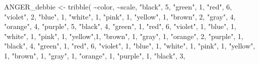 \documentclass[
]{article}
\newenvironment{Shaded}{\begin{snugshade}}{\end{snugshade}}
\newcommand{\DecValTok}[1]{\textcolor[rgb]{0.00,0.00,0.81}{#1}}
\newcommand{\FunctionTok}[1]{\textcolor[rgb]{0.00,0.00,0.00}{#1}}
\newcommand{\NormalTok}[1]{#1}
\newcommand{\OtherTok}[1]{\textcolor[rgb]{0.56,0.35,0.01}{#1}}
\newcommand{\SpecialCharTok}[1]{\textcolor[rgb]{0.00,0.00,0.00}{#1}}
\newcommand{\StringTok}[1]{\textcolor[rgb]{0.31,0.60,0.02}{#1}}
\begin{document}
\begin{Shaded}
\begin{Highlighting}[]
\NormalTok{ANGER\_debbie }\OtherTok{\textless{}{-}} \FunctionTok{tribble}\NormalTok{(}
  \SpecialCharTok{\textasciitilde{}}\NormalTok{color, }\SpecialCharTok{\textasciitilde{}}\NormalTok{scale,}
  \StringTok{"black"}\NormalTok{, }\DecValTok{5}\NormalTok{,}
  \StringTok{"green"}\NormalTok{, }\DecValTok{1}\NormalTok{,}
  \StringTok{"red"}\NormalTok{, }\DecValTok{6}\NormalTok{,}
  \StringTok{"violet"}\NormalTok{, }\DecValTok{2}\NormalTok{, }
  \StringTok{"blue"}\NormalTok{, }\DecValTok{1}\NormalTok{,}
  \StringTok{"white"}\NormalTok{, }\DecValTok{1}\NormalTok{,}
  \StringTok{"pink"}\NormalTok{, }\DecValTok{1}\NormalTok{,}
  \StringTok{"yellow"}\NormalTok{, }\DecValTok{1}\NormalTok{,}
  \StringTok{"brown"}\NormalTok{, }\DecValTok{2}\NormalTok{,}
  \StringTok{"gray"}\NormalTok{, }\DecValTok{4}\NormalTok{,}
  \StringTok{"orange"}\NormalTok{, }\DecValTok{4}\NormalTok{,}
  \StringTok{"purple"}\NormalTok{, }\DecValTok{5}\NormalTok{,}
  \StringTok{"black"}\NormalTok{, }\DecValTok{4}\NormalTok{,}
  \StringTok{"green"}\NormalTok{, }\DecValTok{1}\NormalTok{,}
  \StringTok{"red"}\NormalTok{, }\DecValTok{6}\NormalTok{,}
  \StringTok{"violet"}\NormalTok{, }\DecValTok{1}\NormalTok{,}
  \StringTok{"blue"}\NormalTok{, }\DecValTok{1}\NormalTok{,}
  \StringTok{"white"}\NormalTok{, }\DecValTok{1}\NormalTok{,}
  \StringTok{"pink"}\NormalTok{, }\DecValTok{1}\NormalTok{,}
  \StringTok{"yellow"}\NormalTok{,}\DecValTok{1}\NormalTok{,}
  \StringTok{"brown"}\NormalTok{, }\DecValTok{1}\NormalTok{,}
  \StringTok{"gray"}\NormalTok{, }\DecValTok{1}\NormalTok{,}
  \StringTok{"orange"}\NormalTok{, }\DecValTok{2}\NormalTok{,}
  \StringTok{"purple"}\NormalTok{, }\DecValTok{1}\NormalTok{,}
    \StringTok{"black"}\NormalTok{, }\DecValTok{4}\NormalTok{,}
  \StringTok{"green"}\NormalTok{, }\DecValTok{1}\NormalTok{,}
  \StringTok{"red"}\NormalTok{, }\DecValTok{6}\NormalTok{,}
  \StringTok{"violet"}\NormalTok{, }\DecValTok{1}\NormalTok{,}
  \StringTok{"blue"}\NormalTok{, }\DecValTok{1}\NormalTok{,}
  \StringTok{"white"}\NormalTok{, }\DecValTok{1}\NormalTok{,}
  \StringTok{"pink"}\NormalTok{, }\DecValTok{1}\NormalTok{,}
  \StringTok{"yellow"}\NormalTok{, }\DecValTok{1}\NormalTok{,}
  \StringTok{"brown"}\NormalTok{, }\DecValTok{1}\NormalTok{,}
  \StringTok{"gray"}\NormalTok{, }\DecValTok{1}\NormalTok{,}
  \StringTok{"orange"}\NormalTok{, }\DecValTok{1}\NormalTok{,}
  \StringTok{"purple"}\NormalTok{, }\DecValTok{1}\NormalTok{,}
    \StringTok{"black"}\NormalTok{, }\DecValTok{3}\NormalTok{,}

\end{Highlighting}
\end{Shaded}
\end{document}
